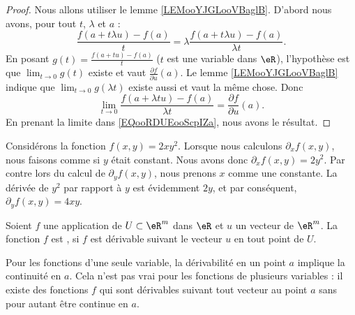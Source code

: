 \begin{proof}
	Nous allons utiliser le lemme \ref{LEMooYJGLooVBaglB}. D'abord nous avons, pour tout \( t\), \( \lambda\) et \( a\)  :
	\begin{equation}        \label{EQooRDUEooScpIZa}
		\frac{ f(a+t\lambda u)-f(a) }{ t }=\lambda\frac{ f(a+t\lambda u)-f(a) }{ \lambda t }.
	\end{equation}
	En posant \( g(t)=\frac{ f(a+tu)-f(a) }{ t }\) (\( t\) est une variable dans \( \eR\)), l'hypothèse est que \( \lim_{t\to 0} g(t)\) existe et vaut \( \frac{ \partial f }{ \partial u }(a)\). Le lemme \ref{LEMooYJGLooVBaglB} indique que \( \lim_{t\to 0} g(\lambda t)\) existe aussi et vaut la même chose. Donc
	\begin{equation}
		\lim_{t\to 0} \frac{ f(a+\lambda tu)-f(a) }{ \lambda t }=\frac{ \partial f }{ \partial u }(a).
	\end{equation}
	En prenant la limite dans \eqref{EQooRDUEooScpIZa}, nous avons le résultat.
\end{proof}

\begin{example}
	Considérons la fonction \( f(x,y)=2xy^2\). Lorsque nous calculons \( \partial_xf(x,y)\), nous faisons comme si \( y\) était constant. Nous avons donc \( \partial_xf(x,y)=2y^2\). Par contre lors du calcul de \( \partial_yf(x,y)\), nous prenons \( x\) comme une constante. La dérivée de \( y^2\) par rapport à \( y\) est évidemment \( 2y\), et par conséquent, \( \partial_yf(x,y)=4xy\).
\end{example}

\begin{definition}
	Soient \( f\) une application de \( U\subset\eR^m\) dans \( \eR\) et \( u\) un vecteur de \( \eR^m\). La fonction \( f\) est , si \( f\) est dérivable  suivant le vecteur \( u\) en tout point de \( U\).
\end{definition}

Pour les fonctions d'une seule variable, la dérivabilité en un point \( a\) implique la continuité en \( a\). Cela n'est pas vrai pour les fonctions de plusieurs variables : il existe des fonctions \( f\)  qui sont dérivables suivant tout vecteur au point \( a\) sans pour autant être continue en \( a\).

